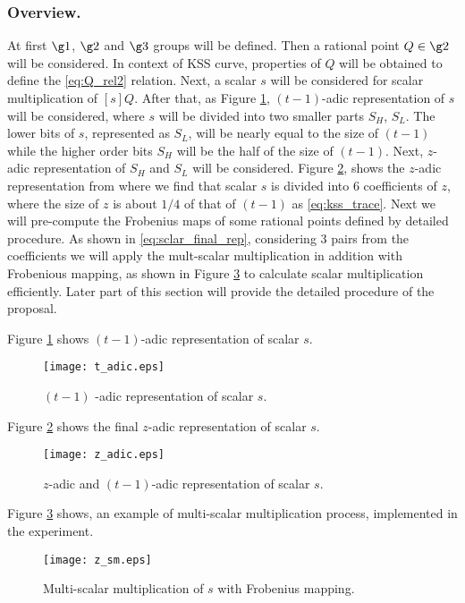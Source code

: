 \subsubsection{Overview.} At first $\g1$, $\g2$ and $\g3$ groups will be defined. Then a rational point $Q \in \g2$ will be considered. In context of KSS curve, properties of $Q$ will be obtained to define the \eqref{eq:Q_rel2} relation. Next, a scalar $s$ will be considered for scalar multiplication of $[s]Q$. After that, as Figure \ref{fig:t_adic}, $(t-1)$-adic representation of $s$ will be considered, where $s$ will be divided into two smaller parts $S_H$, $S_L$. The lower bits of $s$, represented as $S_L$, will be nearly equal to the size of $(t-1)$ while the higher order bits $S_H$ will be the half of the size of $(t-1)$. Next, $z$-adic representation of $S_H$ and $S_L$ will be considered. Figure \ref{fig:z_adicl}, shows the $z$-adic representation from where we find that scalar $s$ is divided into 6 coefficients of $z$, where the size of $z$ is about $1/4$ of that of $(t-1)$ as \eqref{eq:kss_trace}. Next we will pre-compute the Frobenius maps of some rational points defined by detailed procedure. As shown in \eqref{eq:sclar_final_rep}, considering 3 pairs   from the coefficients we will apply the mult-scalar multiplication in addition with Frobenious mapping, as shown in Figure \ref{fig:z_sml} to calculate scalar multiplication efficiently. Later part of this section will provide the detailed procedure of the proposal.

Figure \ref{fig:t_adic} shows $(t-1)$-adic representation of scalar $s$. 
\begin{figure}[!ht]
\centering
\texttt{[image: t\_adic.eps]}
\caption{$(t-1)$ -adic representation of scalar $s$.}
\label{fig:t_adic}
\end{figure}

Figure \ref{fig:z_adicl} shows the final $z$-adic representation of scalar $s$. 
\begin{figure}[!ht]
\centering
\texttt{[image: z\_adic.eps]}
\caption{$z$-adic and $(t-1)$-adic representation of scalar $s$.}
\label{fig:z_adicl}
\end{figure}

Figure \ref{fig:z_sml} shows, an example of multi-scalar multiplication process, implemented in the experiment.
\begin{figure}[!ht]
\centering
\texttt{[image: z\_sm.eps]}
\caption{Multi-scalar multiplication of $s$ with Frobenius mapping.}
\label{fig:z_sml}
\end{figure}

